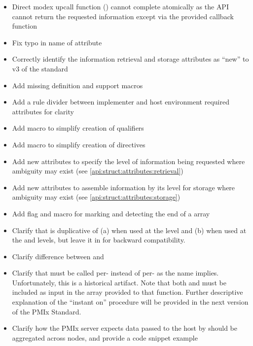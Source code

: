 {\begin{itemize}
    \item Direct modex upcall function () cannot complete atomically as the \ac{API} cannot return the requested information except via the provided callback function
    \item Fix typo in name of  attribute
    \item Correctly identify the information retrieval and storage attributes as ``new'' to v3 of the standard
    \item Add missing  definition and support macros
    \item Add a rule divider between implementer and host environment required attributes for clarity
    \item Add  macro to simplify creation of  qualifiers
    \item Add  macro to simplify creation of  directives
    \item Add new attributes to specify the level of information being requested where ambiguity may exist (see \ref{api:struct:attributes:retrieval})
    \item Add new attributes to assemble information by its level for storage where ambiguity may exist (see \ref{api:struct:attributes:storage})
    \item Add flag and  macro for marking and detecting the end of a  array
    \item Clarify that  is duplicative of (a)  when used at the  level and (b)  when used at the  and  levels, but leave it in for backward compatibility.
    \item Clarify difference between  and 
    \item Clarify that  must be called per- instead of per- as the name implies. Unfortunately, this is a historical artifact. Note that both  and  must be included as input in the  array provided to that function. Further descriptive explanation of the ``instant on'' procedure will be provided in the next version of the \ac{PMIx} Standard.
    \item Clarify how the \ac{PMIx} server expects data passed to the host by  should be aggregated across nodes, and provide a code snippet example
\end{itemize}


}
